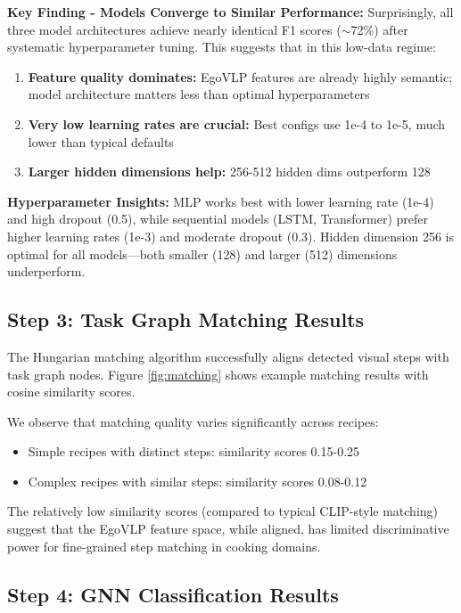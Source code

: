 \documentclass[10pt,twocolumn,letterpaper]{article}
\begin{document}
\textbf{Key Finding - Models Converge to Similar Performance:} Surprisingly, all three model architectures achieve nearly identical F1 scores ($\sim$72\%) after systematic hyperparameter tuning. This suggests that in this low-data regime:
\begin{enumerate}
    \item \textbf{Feature quality dominates:} EgoVLP features are already highly semantic; model architecture matters less than optimal hyperparameters
    \item \textbf{Very low learning rates are crucial:} Best configs use 1e-4 to 1e-5, much lower than typical defaults
    \item \textbf{Larger hidden dimensions help:} 256-512 hidden dims outperform 128
\end{enumerate}

\textbf{Hyperparameter Insights:} MLP works best with lower learning rate (1e-4) and high dropout (0.5), while sequential models (LSTM, Transformer) prefer higher learning rates (1e-3) and moderate dropout (0.3). Hidden dimension 256 is optimal for all models---both smaller (128) and larger (512) dimensions underperform.

\subsection{Step 3: Task Graph Matching Results}

The Hungarian matching algorithm successfully aligns detected visual steps with task graph nodes. Figure \ref{fig:matching} shows example matching results with cosine similarity scores.

We observe that matching quality varies significantly across recipes:
\begin{itemize}
    \item Simple recipes with distinct steps: similarity scores 0.15-0.25
    \item Complex recipes with similar steps: similarity scores 0.08-0.12
\end{itemize}

The relatively low similarity scores (compared to typical CLIP-style matching) suggest that the EgoVLP feature space, while aligned, has limited discriminative power for fine-grained step matching in cooking domains.

\subsection{Step 4: GNN Classification Results}
\end{document}
